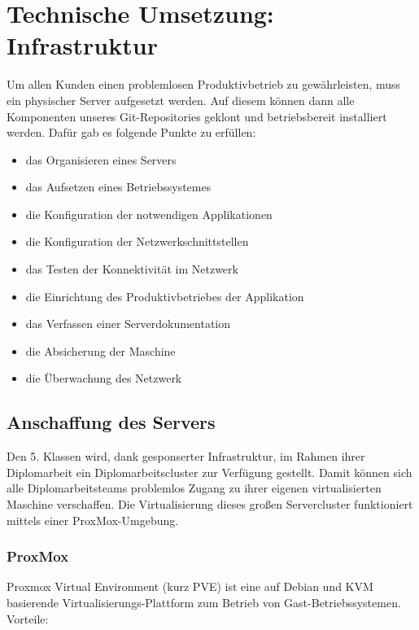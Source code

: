 \hypertarget{technische-umsetzung-infrastruktur}{%
\section{Technische Umsetzung:
Infrastruktur}\label{technische-umsetzung-infrastruktur}}

Um allen Kunden einen problemlosen Produktivbetrieb zu gewährleisten,
muss ein physischer Server aufgesetzt werden. Auf diesem können dann
alle Komponenten unseres Git-Repositories geklont und betriebsbereit
installiert werden. Dafür gab es folgende Punkte zu erfüllen:

\begin{itemize}
\tightlist
\item
  das Organisieren eines Servers
\item
  das Aufsetzen eines Betriebssystemes
\item
  die Konfiguration der notwendigen Applikationen
\item
  die Konfiguration der Netzwerkschnittstellen
\item
  das Testen der Konnektivität im Netzwerk
\item
  die Einrichtung des Produktivbetriebes der Applikation
\item
  das Verfassen einer Serverdokumentation
\item
  die Absicherung der Maschine
\item
  die Überwachung des Netzwerk
\end{itemize}

\hypertarget{anschaffung-des-servers}{%
\subsection{Anschaffung des Servers}\label{anschaffung-des-servers}}

Den 5. Klassen wird, dank gesponserter Infrastruktur, im Rahmen ihrer
Diplomarbeit ein Diplomarbeitscluster zur Verfügung gestellt. Damit
können sich alle Diplomarbeitsteams problemlos Zugang zu ihrer eigenen
virtualisierten Maschine verschaffen. Die Virtualisierung dieses großen
Servercluster funktioniert mittels einer ProxMox-Umgebung.

\hypertarget{proxmox}{%
\subsubsection{ProxMox}\label{proxmox}}

Proxmox Virtual Environment (kurz PVE) ist eine auf Debian und KVM
basierende Virtualisierungs-Plattform zum Betrieb von
Gast-Betriebssystemen. Vorteile:

